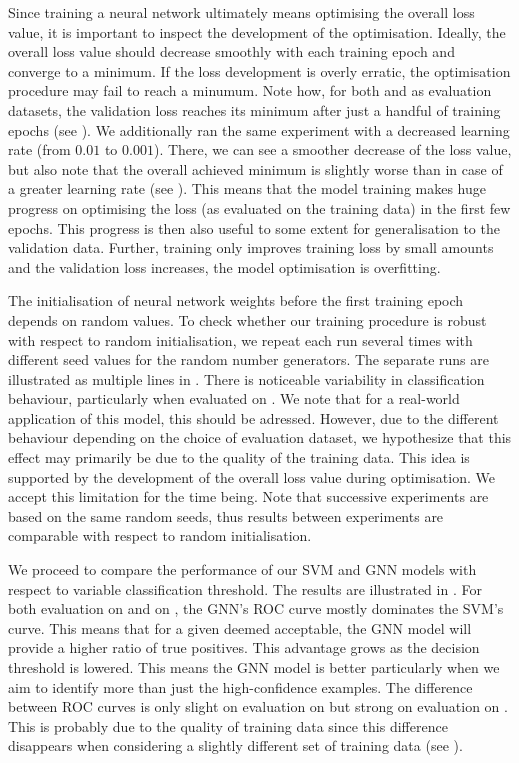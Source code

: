 \documentclass[
	fontsize=10pt, %
	twoside=true, %
	secnumdepth=1, %
  toc=indentunnumbered %
]{kaobook}
\begin{document}
Since training a neural network ultimately means optimising the overall loss
value, it is important to inspect the development of the optimisation. Ideally,
the overall loss value should decrease smoothly with each training epoch and
converge to a minimum. If the loss development is overly erratic, the
optimisation procedure may fail to reach a minumum. Note how, for both \PDMap{}
and \ReconMap{} as evaluation datasets, the validation loss reaches its minimum
after just a handful of training epochs (see ). We
additionally ran the same experiment with a decreased learning rate (from $0.01$
to $0.001$). There, we can see a smoother decrease of the loss value, but also
note that the overall achieved minimum is slightly worse than in case of a
greater learning rate (see ). This
means that the model training makes huge progress on optimising the loss (as
evaluated on the training data) in the first few epochs. This progress is then
also useful to some extent for generalisation to the validation data. Further,
training only improves training loss by small amounts and the validation loss
increases, the model optimisation is overfitting.

The initialisation of neural network weights before the first training epoch
depends on random values. To check whether our training procedure is robust with
respect to random initialisation, we repeat each run several times with
different seed values for the random number generators. The separate runs are
illustrated as multiple lines in . There is noticeable
variability in classification behaviour, particularly when evaluated on \ReconMap{}.
We note that for a real-world application of this model, this should be
adressed. However, due to the different behaviour depending on the choice of
evaluation dataset, we hypothesize that this effect may primarily be due to the
quality of the training data. This idea is supported by the development of the
overall loss value during optimisation. We accept this limitation for the time
being. Note that successive experiments are based on the same random seeds, thus
results between experiments are comparable with respect to random initialisation.

We proceed to compare the performance of our SVM and GNN models with respect to
variable classification threshold. The results are illustrated in
. For both evaluation on \PDMap{} and on \ReconMap{},
the GNN's ROC curve mostly dominates the SVM's curve. This means that for a given
\FPR{} deemed acceptable, the GNN model will provide a higher ratio of true
positives. This advantage grows as the decision threshold is lowered. This means the
GNN model is better particularly when we aim to identify more than just the
high-confidence examples. The difference between ROC curves is only slight on
evaluation on \PDMap{} but strong on evaluation on \ReconMap{}. This is probably
due to the quality of training data since this difference disappears when
considering a slightly different set of training data (see ).
\end{document}
